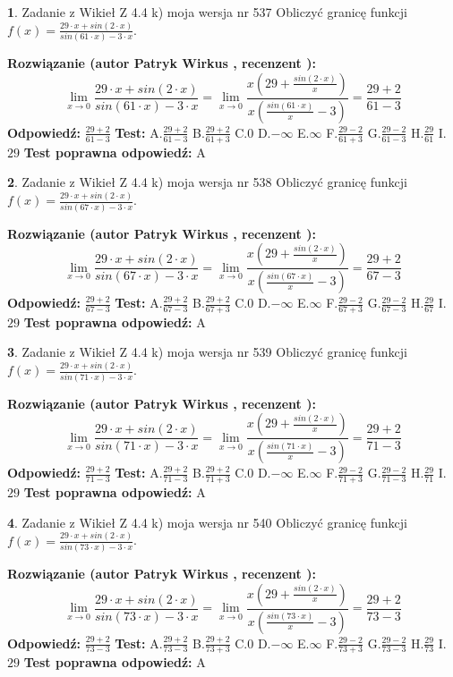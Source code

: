 \documentclass[12pt, a4paper]{article}
\theoremstyle{definition} %
\newtheorem{zad}{}
\newcommand{\zadStart}[1]{\begin{zad}#1\newline}
\newcommand{\zadStop}{\end{zad}}
\newcommand{\rozwStart}[2]{\noindent \textbf{Rozwiązanie (autor #1 , recenzent #2): }\newline}
\newcommand{\rozwStop}{\newline}
\newcommand{\odpStart}{\noindent \textbf{Odpowiedź:}\newline}
\newcommand{\odpStop}{\newline}
\newcommand{\testStart}{\noindent \textbf{Test:}\newline}
\newcommand{\testStop}{\newline}
\newcommand{\kluczStart}{\noindent \textbf{Test poprawna odpowiedź:}\newline}
\newcommand{\kluczStop}{\newline}
\begin{document}
\zadStart{Zadanie z Wikieł Z 4.4 k) moja wersja nr 537}
Obliczyć granicę funkcji $f(x)=\frac{29\cdot x +sin(2\cdot x)}{sin(61\cdot x) -3\cdot x}$.
\zadStop
\rozwStart{Patryk Wirkus}{}
$$\lim\limits_{x\to 0}\frac{29\cdot x +sin(2\cdot x)}{sin(61\cdot x) -3\cdot x}
=\lim\limits_{x\to 0}\frac{x(29+\frac{sin(2\cdot x)}{x})}{x(\frac{sin(61\cdot x)}{x}-3)}
=\frac{29+2}{61-3}$$
\rozwStop
\odpStart
$\frac{29+2}{61-3}$
\odpStop
\testStart
A.$\frac{29+2}{61-3}$
B.$\frac{29+2}{61+3}$
C.$0$
D.$-\infty$
E.$\infty$
F.$\frac{29-2}{61+3}$
G.$\frac{29-2}{61-3}$
H.$\frac{29}{61}$
I.$29$
\testStop
\kluczStart
A
\kluczStop



\zadStart{Zadanie z Wikieł Z 4.4 k) moja wersja nr 538}
Obliczyć granicę funkcji $f(x)=\frac{29\cdot x +sin(2\cdot x)}{sin(67\cdot x) -3\cdot x}$.
\zadStop
\rozwStart{Patryk Wirkus}{}
$$\lim\limits_{x\to 0}\frac{29\cdot x +sin(2\cdot x)}{sin(67\cdot x) -3\cdot x}
=\lim\limits_{x\to 0}\frac{x(29+\frac{sin(2\cdot x)}{x})}{x(\frac{sin(67\cdot x)}{x}-3)}
=\frac{29+2}{67-3}$$
\rozwStop
\odpStart
$\frac{29+2}{67-3}$
\odpStop
\testStart
A.$\frac{29+2}{67-3}$
B.$\frac{29+2}{67+3}$
C.$0$
D.$-\infty$
E.$\infty$
F.$\frac{29-2}{67+3}$
G.$\frac{29-2}{67-3}$
H.$\frac{29}{67}$
I.$29$
\testStop
\kluczStart
A
\kluczStop



\zadStart{Zadanie z Wikieł Z 4.4 k) moja wersja nr 539}
Obliczyć granicę funkcji $f(x)=\frac{29\cdot x +sin(2\cdot x)}{sin(71\cdot x) -3\cdot x}$.
\zadStop
\rozwStart{Patryk Wirkus}{}
$$\lim\limits_{x\to 0}\frac{29\cdot x +sin(2\cdot x)}{sin(71\cdot x) -3\cdot x}
=\lim\limits_{x\to 0}\frac{x(29+\frac{sin(2\cdot x)}{x})}{x(\frac{sin(71\cdot x)}{x}-3)}
=\frac{29+2}{71-3}$$
\rozwStop
\odpStart
$\frac{29+2}{71-3}$
\odpStop
\testStart
A.$\frac{29+2}{71-3}$
B.$\frac{29+2}{71+3}$
C.$0$
D.$-\infty$
E.$\infty$
F.$\frac{29-2}{71+3}$
G.$\frac{29-2}{71-3}$
H.$\frac{29}{71}$
I.$29$
\testStop
\kluczStart
A
\kluczStop



\zadStart{Zadanie z Wikieł Z 4.4 k) moja wersja nr 540}
Obliczyć granicę funkcji $f(x)=\frac{29\cdot x +sin(2\cdot x)}{sin(73\cdot x) -3\cdot x}$.
\zadStop
\rozwStart{Patryk Wirkus}{}
$$\lim\limits_{x\to 0}\frac{29\cdot x +sin(2\cdot x)}{sin(73\cdot x) -3\cdot x}
=\lim\limits_{x\to 0}\frac{x(29+\frac{sin(2\cdot x)}{x})}{x(\frac{sin(73\cdot x)}{x}-3)}
=\frac{29+2}{73-3}$$
\rozwStop
\odpStart
$\frac{29+2}{73-3}$
\odpStop
\testStart
A.$\frac{29+2}{73-3}$
B.$\frac{29+2}{73+3}$
C.$0$
D.$-\infty$
E.$\infty$
F.$\frac{29-2}{73+3}$
G.$\frac{29-2}{73-3}$
H.$\frac{29}{73}$
I.$29$
\testStop
\kluczStart
A
\kluczStop
\end{document}
